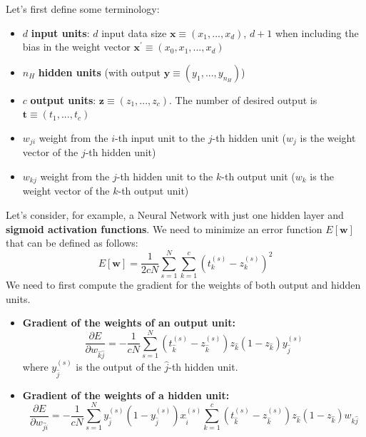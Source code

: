 Let's first define some terminology:
\begin{itemize}
    \item $d$ \textbf{input units}: $d$ input data size $\textbf{x} \equiv (x_{1},...,x_{d})$, $d + 1$ when including the bias in the weight vector $\textbf{x}^{'} \equiv (x_{0}, x_{1},...,x_{d})$

    \item $n_{H}$ \textbf{hidden units} (with output $\textbf{y} \equiv (y_{1},...,y_{n_{H}})$)

    \item $c$ \textbf{output units}: $\textbf{z} \equiv (z_{1},...,z_{c})$. The number of desired output is $\textbf{t} \equiv (t_{1},...,t_{c})$

    \item $w_{ji}$ weight from the $i$-th input unit to the $j$-th hidden unit ($w_{j}$ is the weight vector of the $j$-th hidden unit)

    \item $w_{kj}$ weight from the $j$-th hidden unit to the $k$-th output unit ($w_{k}$ is the weight vector of the $k$-th output unit)
\end{itemize}
Let's consider, for example, a Neural Network with just one hidden layer and \textbf{sigmoid activation functions}. We need to minimize an error function $E[\textbf{w}]$ that can be defined as follows:
\[E[\textbf{w}] = \frac{1}{2cN}\sum_{s=1}^{N}\sum_{k=1}^{c}(t_{k}^{(s)} - z_{k}^{(s)})^{2}\]
We need to first compute the gradient for the weights of both output and hidden units.
\begin{itemize}
    \item \textbf{Gradient of the weights of an output unit:}
    \[\frac{\partial E}{\partial w_{\hat{k}\hat{j}}} = - \frac{1}{cN}\sum_{s=1}^{N}(t_{\hat{k}}^{(s)} - z_{\hat{k}}^{(s)} )z_{\hat{k}}(1 - z_{\hat{k}})y_{\hat{j}}^{(s)}\]
    where $y_{\hat{j}}^{(s)}$ is the output of the $\hat{j}$-th hidden unit.
    
    \item \textbf{Gradient of the weights of a hidden unit:}
    \[\frac{\partial E}{\partial w_{\hat{j}\hat{i}}} = - \frac{1}{cN}\sum_{s=1}^{N}y_{\hat{j}}^{(s)}(1 - y_{\hat{j}}^{(s)})x_{\hat{i}}^{(s)}\sum_{k=1}^{c}(t_{\hat{k}}^{(s)} - z_{\hat{k}}^{(s)} )z_{\hat{k}}(1 - z_{\hat{k}})w_{k\hat{j}}\]
\end{itemize}

